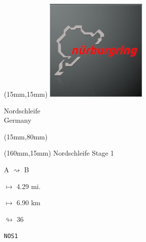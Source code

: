 \begin{textblock*}{50mm}(15mm,15mm)%
\includegraphics[width=50mm]{LG/2015-05-20_00088.png}
\par Nordschleife\\ Germany
\end{textblock*}
\begin{textblock*}{185mm}(15mm,80mm)%
\end{textblock*}
\begin{textblock*}{40mm}(160mm,15mm)%
Nordschleife Stage 1
\par A $\rightsquigarrow$ B
\Large
\par$\mapsto$ 4.29 mi.
\par$\mapsto$ 6.90 km
\par$\looparrowright$ 36
\par\hfill\tiny\tt NOS1\\
\end{textblock*}
\null\newpage

